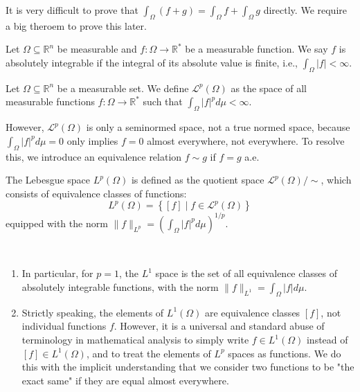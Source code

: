\begin{remark}
    It is very difficult to prove that $\int_\Omega (f+g) = \int_\Omega f + \int_\Omega g$ directly. 
    We require a big theroem to prove this later.
\end{remark}

\begin{definition}
    Let $\Omega \subseteq \mathbb{R}^n$ be measurable and $f : \Omega \rightarrow \mathbb{R}^*$ be a measurable function. We say $f$ is absolutely integrable if the integral of its absolute value is finite, i.e., $\int_\Omega |f| < \infty$.
\end{definition}

\begin{definition}
    Let $\Omega \subseteq \mathbb{R}^n$ be a measurable set. We define $\mathcal{L}^p(\Omega)$ as the space of all measurable functions $f: \Omega \rightarrow \mathbb{R}^*$ such that $\int_\Omega |f|^p d\mu < \infty$. 
\end{definition}
    However, $\mathcal{L}^p(\Omega)$ is only a seminormed space, not a true normed space, because $\int_\Omega |f|^p d\mu = 0$ only implies $f = 0$ almost everywhere, not everywhere. To resolve this, we introduce an equivalence relation $f \sim g$ if $f = g$ a.e. 

\begin{definition}
    The Lebesgue space $L^p(\Omega)$ is defined as the quotient space $\mathcal{L}^p(\Omega) / \sim$, which consists of equivalence classes of functions:
    $$ L^p(\Omega) = \left\{ [f] \mid f \in \mathcal{L}^p(\Omega) \right\} $$
    equipped with the norm $\|f\|_{L^p} = \left( \int_\Omega |f|^p d\mu \right)^{1/p}$.     
\end{definition}

\begin{remark}\ \vspace{-1em}
    \begin{enumerate}
        \item In particular, for $p=1$, the $L^1$ space is the set of all equivalence classes of absolutely integrable functions, with the norm $\|f\|_{L^1} = \int_\Omega |f| d\mu$.
        \item Strictly speaking, the elements of $L^1(\Omega)$ are equivalence classes $[f]$, not individual functions $f$. However, it is a universal and standard abuse of terminology in mathematical analysis to simply write $f \in L^1(\Omega)$ instead of $[f] \in L^1(\Omega)$, and to treat the elements of $L^p$ spaces as functions. We do this with the implicit understanding that we consider two functions to be "the exact same" if they are equal almost everywhere.
    \end{enumerate}
\end{remark}


